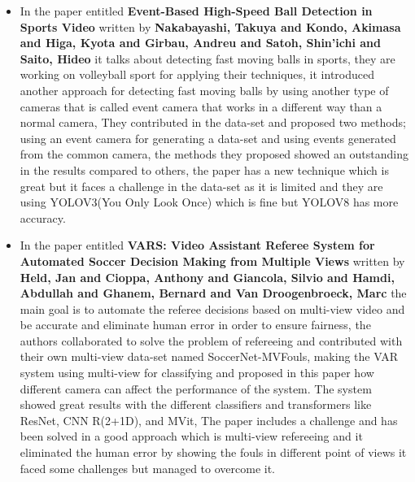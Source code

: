 \documentclass[12pt]{article}
\begin{document}
\begin{itemize}
        \item 
        In the paper entitled \textbf {Event-Based High-Speed Ball Detection in Sports Video} \cite{10.1145/3606038.3616164} written by \textbf {Nakabayashi, Takuya and Kondo, Akimasa and Higa, Kyota and Girbau, Andreu and Satoh, Shin'ichi and Saito, Hideo} it talks about detecting fast moving balls in sports, they are working on volleyball sport for applying their techniques, it introduced another approach for detecting fast moving balls by using another type of cameras that is called event camera that works in a different way than a normal camera, They contributed in the data-set and proposed two methods; using an event camera for generating a data-set and using events generated from the common camera, the methods they proposed showed an outstanding in the results compared to others, the paper has a new technique which is great but it faces a challenge in the data-set as it is limited and they are using YOLOV3(You Only Look Once) which is fine but YOLOV8 has more accuracy.  
 
        \item 
        In the paper entitled \textbf {VARS: Video Assistant Referee System for Automated Soccer Decision Making from Multiple Views} \cite{10208684} written by \textbf {Held, Jan and Cioppa, Anthony and Giancola, Silvio and Hamdi, Abdullah and Ghanem, Bernard and Van Droogenbroeck, Marc} the main goal is to automate the referee decisions based on multi-view video and be accurate and eliminate human error in order to ensure fairness, the authors collaborated to solve the problem of refereeing and contributed with their own multi-view data-set named SoccerNet-MVFouls, making the VAR system using multi-view for classifying and proposed in this paper how different camera can affect the performance of the system. The system showed great results with the different classifiers and transformers like ResNet, CNN R(2+1D), and MVit, The paper includes a challenge and has been solved in a good approach which is multi-view refereeing and it eliminated the human error by showing the fouls in different point of views it faced some challenges but managed to overcome it.


\end{itemize}
\end{document}
